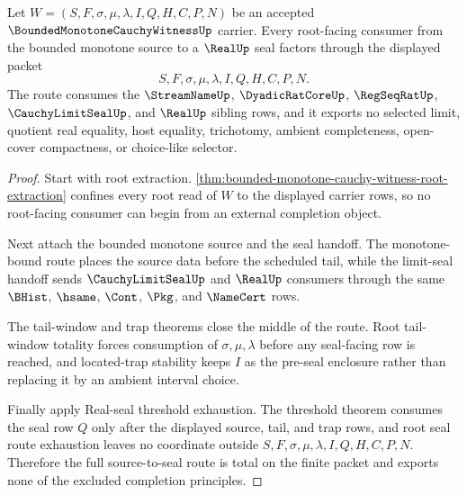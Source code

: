 \begin{theorem}
\label{thm:bounded-monotone-cauchy-witness-root-source-seal-totality}
Let $W=(S,F,\sigma,\mu,\lambda,I,Q,H,C,P,N)$ be an accepted $\BoundedMonotoneCauchyWitnessUp$ carrier. Every root-facing consumer from the bounded monotone source to a $\RealUp$ seal factors through the displayed packet
$$
S,F,\sigma,\mu,\lambda,I,Q,H,C,P,N.
$$
The route consumes the $\StreamNameUp$, $\DyadicRatCoreUp$, $\RegSeqRatUp$, $\CauchyLimitSealUp$, and $\RealUp$ sibling rows, and it exports no selected limit, quotient real equality, host equality, trichotomy, ambient completeness, open-cover compactness, or choice-like selector.
\end{theorem}
\begin{proof}
Start with root extraction. \autoref{thm:bounded-monotone-cauchy-witness-root-extraction} confines every root read of $W$ to the displayed carrier rows, so no root-facing consumer can begin from an external completion object.

Next attach the bounded monotone source and the seal handoff. The monotone-bound route places the source data before the scheduled tail, while the limit-seal handoff sends $\CauchyLimitSealUp$ and $\RealUp$ consumers through the same $\BHist$, $\hsame$, $\Cont$, $\Pkg$, and $\NameCert$ rows.

The tail-window and trap theorems close the middle of the route. Root tail-window totality forces consumption of $\sigma,\mu,\lambda$ before any seal-facing row is reached, and located-trap stability keeps $I$ as the pre-seal enclosure rather than replacing it by an ambient interval choice.

Finally apply Real-seal threshold exhaustion. The threshold theorem consumes the seal row $Q$ only after the displayed source, tail, and trap rows, and root seal route exhaustion leaves no coordinate outside $S,F,\sigma,\mu,\lambda,I,Q,H,C,P,N$. Therefore the full source-to-seal route is total on the finite packet and exports none of the excluded completion principles.
\end{proof}


